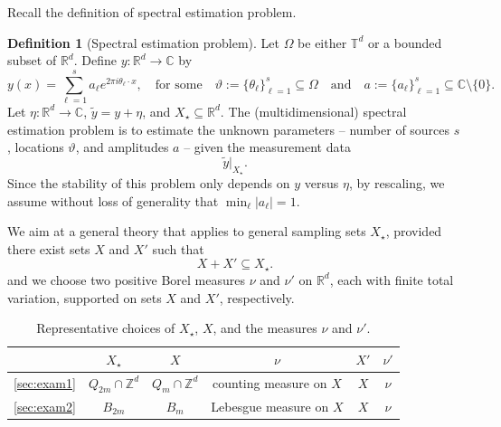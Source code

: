 \documentclass[11pt]{article}
\theoremstyle{definition}
\newtheorem{definition}{Definition}[section]
\numberwithin{theorem}{section}
\numberwithin{lemma}{section}
\numberwithin{equation}{section}
\def\C{\mathbb{C}}
\def\R{\mathbb{R}}
\def\T{\mathbb{T}}
\def\Z{\mathbb{Z}}
\renewcommand{\subset}{\subseteq}
\renewcommand{\tilde}{\widetilde}
\newcommand{\domain}{\Omega}
\newcommand{\sampset}{X}
\newcommand{\bfa}{a}
\def\andspace{\quad\text{and}\quad}
\newcommand{\red}{\color{red}}
\numberwithin{equation}{section}
\begin{document}
{Recall the definition of spectral estimation problem. 	}
	\begin{definition}[Spectral estimation problem]
		\label{def:spectral}
		Let $\Omega$ be either $\T^d$ or a bounded subset of $\R^d$. Define $y\colon \R^d\to\C$ by
		\begin{equation*}
			y(x)=\sum_{\ell=1}^s a_\ell e^{2\pi i \theta_\ell \cdot x}, \quad \text{for some}\quad  \vartheta:=\{\theta_\ell\}_{\ell=1}^s\subset \domain \andspace \bfa:=\{a_\ell\}_{\ell=1}^s\subset \C\setminus\{0\}. 
		\end{equation*}
		Let $\eta\colon \R^d\to\C$, $\tilde y= y+\eta$, and $X_\star\subset\R^d$. The (multidimensional) spectral estimation problem is to estimate the unknown parameters -- number of sources $s$, locations $\vartheta$, and amplitudes $\bfa$ -- given the measurement data 
		\begin{equation*}
			\tilde y|_{\sampset_\star}.
		\end{equation*}
		Since the stability of this problem only depends on $y$ versus $\eta$, by rescaling, we assume without loss of generality that $\min_\ell |a_\ell|= 1$.
	\end{definition}


We aim at a general  theory that applies to general sampling sets $\sampset_\star$, provided there exist sets $X$ and $X'$ such that
\begin{equation}
X+X'\subset \sampset_\star.\label{eq:sumset}
\end{equation}
and  we choose two positive Borel measures $\nu$ and $\nu'$ on $\R^d$, each with finite total variation, supported on sets $X$ and $X'$, respectively. 

\begin{table}[ht]
	\centering
	\begin{tabular}{|c|c|c|c|c|c|}
		\hline
		& $\sampset_\star$ & $X$ & $\nu$ & $X'$ & $\nu'$ \\
		\hline
		\cref{sec:exam1} & $Q_{2m}\cap \Z^d$ & $Q_m\cap \Z^d$ & counting measure on $X$ & $X$ & $\nu$ \\
		\hline
		\cref{sec:exam2} & $B_{2m}$ & $B_m$ & Lebesgue measure on $X$ & $X$ & $\nu$ \\
		\hline
	\end{tabular}
	\caption{Representative choices of $\sampset_\star$, $X$, and the measures $\nu$ and $\nu'$.}
	\label{table:Omega}
\end{table}
\end{document}
